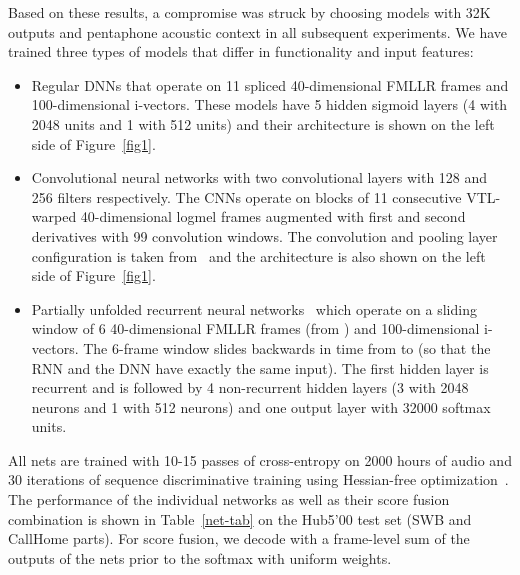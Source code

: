 \documentclass[a4paper]{article}
\begin{document}
Based on these results, a compromise was struck by choosing models
with 32K outputs and pentaphone acoustic context in all subsequent
experiments. We have trained three types of models that differ in
functionality and input features: 
\begin{itemize} 
\item Regular DNNs that operate on 11 spliced 40-dimensional FMLLR frames and 100-dimensional
i-vectors. These models have 5 hidden sigmoid layers (4 with 2048
units and 1 with 512 units) and their architecture is shown on the
left side of Figure~\ref{fig1}.  

\item Convolutional neural networks with two convolutional layers with
128 and 256 filters respectively. The CNNs operate on blocks of 11
consecutive VTL-warped 40-dimensional logmel frames augmented with
first and second derivatives with 99 convolution windows. The convolution and pooling layer configuration is taken from~\cite{sainath13c} and the architecture is also shown on the left side of Figure~\ref{fig1}.

\item Partially unfolded recurrent neural networks~\cite{saon14} which operate on a sliding window of 6 40-dimensional FMLLR frames (from ) and 100-dimensional i-vectors. The 6-frame window slides backwards in time from  to  (so that the RNN and the DNN have exactly the same input). The first hidden layer is recurrent and is followed by 4 non-recurrent hidden layers (3 with 2048 neurons and 1 with 512 neurons) and one output layer with 32000 softmax units.
\end{itemize}

All nets are trained with 10-15 passes of cross-entropy on 2000 hours
of audio and 30 iterations of sequence discriminative training using
Hessian-free optimization~\cite{bedk12}. The performance of the
individual networks as well as their score fusion combination is shown
in Table~\ref{net-tab} on the Hub5'00 test set (SWB and CallHome
parts). For score fusion, we decode with a frame-level sum of the
outputs of the nets prior to the softmax with uniform weights.
\end{document}
